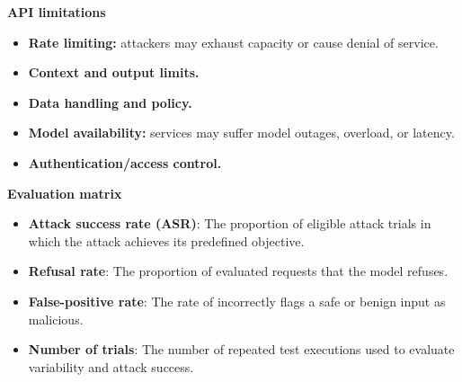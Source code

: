 \documentclass[a4paper,12pt]{report}
\begin{document}
\textbf{API limitations}
    \begin{itemize}
        \item \textbf{Rate limiting:} attackers may exhaust capacity or cause denial of service.
        \item \textbf{Context and output limits.}
        \item \textbf{Data handling and policy.}
        \item \textbf{Model availability:} services may suffer model outages, overload, or latency.
        \item \textbf{Authentication/access control.}
    \end{itemize}

\textbf{Evaluation matrix}
    \begin{itemize}
        \item \textbf{Attack success rate (ASR)}: The proportion of eligible attack trials in which the attack achieves its predefined objective.
        \item \textbf{Refusal rate}: The proportion of evaluated requests that the model refuses.
        \item \textbf{False-positive rate}: The rate of incorrectly flags a safe or benign input as malicious.
        \item \textbf{Number of trials}: The number of repeated test executions used to evaluate variability and attack success.
    \end{itemize}
\end{document}

